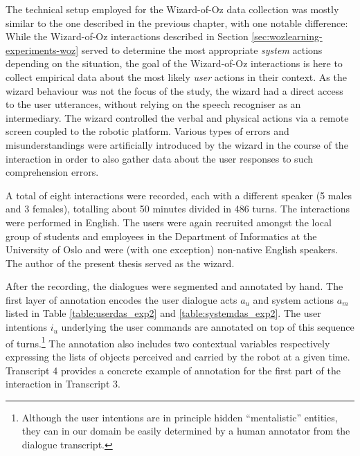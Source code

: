 The technical setup employed for the Wizard-of-Oz data collection was mostly similar to the one described in the previous chapter, with one notable difference:  While the Wizard-of-Oz interactions described in Section \ref{sec:wozlearning-experiments-woz} served to determine the most appropriate \textit{system} actions depending on the situation, the goal of the Wizard-of-Oz interactions is here to collect empirical data about the most likely \textit{user} actions in their context.  As the wizard behaviour was not the focus of the study, the wizard had a direct access to the user utterances, without relying on the speech recogniser as an intermediary. The wizard controlled the verbal and physical actions via a remote screen coupled to the robotic platform. Various types of errors and misunderstandings were artificially introduced by the wizard in the course of the interaction in order to also gather data about the user responses to such comprehension errors. 

A total of eight interactions were recorded, each with a different speaker (5 males and 3 females), totalling about 50 minutes divided in 486 turns.  The interactions were performed in English. The users were again recruited amongst the local group of students and employees in the Department of Informatics at the University of Oslo and were (with one exception) non-native English speakers. The author of the present thesis served as the wizard. 

After the recording, the dialogues were segmented and annotated by hand. The first layer of annotation encodes the user dialogue acts $a_u$ and system actions $a_m$ listed in Table \ref{table:userdas_exp2} and \ref{table:systemdas_exp2}. The user intentions $i_u$ underlying the user commands are annotated on top of this sequence of turns.\footnote{Although the user intentions are in principle hidden ``mentalistic'' entities, they can in our domain be easily determined by a human annotator from the dialogue transcript.} The annotation also includes two contextual variables respectively expressing the lists of objects perceived and carried by the robot at a given time. Transcript 4 provides a concrete example of annotation for the first part of the interaction in Transcript 3. 

